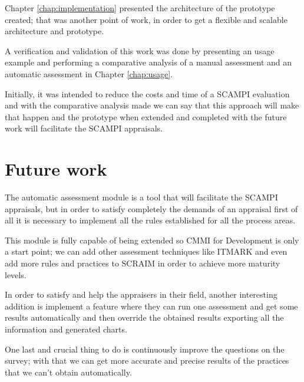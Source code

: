 Chapter \ref{chap:implementation} presented the architecture of the prototype created; that was another point of work, in order to get a flexible and scalable architecture and prototype.

A verification and validation of this work was done by presenting an usage example and performing a comparative analysis of a manual assessment and an automatic assessment in Chapter \ref{chap:usage}. 

Initially, it was intended to reduce the costs and time of a SCAMPI evaluation and with the comparative analysis made we can say that this approach will make that happen and the prototype when extended and completed with the future work will facilitate the SCAMPI appraisals.

\section{Future work}\label{futurework}

The automatic assessment module is a tool that will facilitate the SCAMPI appraisals, but in order to satisfy completely the demands of an appraisal first of all it is necessary to implement all the rules established for all the process areas.

This module is fully capable of being extended so CMMI for Development is only a start point; we can add other assessment techniques like ITMARK and even add more rules and practices to SCRAIM in order to achieve more maturity levels.

In order to satisfy and help the appraisers in their field, another interesting addition is implement a feature where they can run one assessment and get some results automatically and then override the obtained results exporting all the information and generated charts.

One last and crucial thing to do is continuously improve the questions on the survey; with that we can get more accurate and precise results of the practices that we can't obtain automatically. 